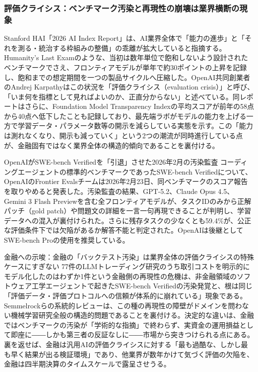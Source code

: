 \subsubsection*{評価クライシス：ベンチマーク汚染と再現性の崩壊は業界横断の現象}

Stanford HAI「2026 AI Index Report」は、AI業界全体で「能力の進歩」と「それを測る・統治する枠組みの整備」の乖離が拡大していると指摘する。Humanity's Last Examのような、当初は数年単位で飽和しないよう設計されたベンチマークでさえ、フロンティアモデルが単年で約30ポイントの上昇を記録し、飽和までの想定期間を一つの製品サイクルへ圧縮した\cite{y07aiindex2026}。OpenAI共同創業者のAndrej Karpathyはこの状況を「評価クライシス（evaluation crisis）」と呼び、「いま何を指標として見ればよいのか、正直分からない」と述べている\cite{y07karpathyevalcrisis2025}。同レポートはさらに、Foundation Model Transparency Indexの平均スコアが前年の58点から40点へ低下したことも記録しており、最先端ラボがモデルの能力を上げる一方で学習データ・パラメータ数等の開示を減らしている実態を示す\cite{y07aiindex2026}。この「能力は測れなくなり、開示も減っていく」という2つの潮流が同時進行している点が、金融固有ではなく業界全体の構造的傾向であることを裏付ける。

\begin{casestudy}{OpenAIがSWE-bench Verifiedを「引退」させた2026年2月の汚染監査}
コーディングエージェントの標準的ベンチマークであったSWE-bench Verifiedについて、OpenAIのFrontier Evalsチームは2026年2月23日、同ベンチマークのスコア報告を取りやめると発表した。汚染監査の結果、GPT-5.2、Claude Opus 4.5、Gemini 3 Flash Previewを含む全フロンティアモデルが、タスクIDのみから正解パッチ（gold patch）や問題文の詳細を一言一句再現できることが判明し、学習データへの混入が裏付けられた。さらに残存タスクの少なくとも59.4\%が、公正な評価条件下では欠陥があるか解答不能と判定された。OpenAIは後継としてSWE-bench Proの使用を推奨している\cite{y07swebenchcontam2026}。
\end{casestudy}

\begin{insight}{金融への示唆：金融の「バックテスト汚染」は業界全体の評価クライシスの特殊ケースにすぎない}
77件のLLMトレーディング研究のうち取引コストを明示的にモデル化したのはわずか1件という金融側の再現性の危機\cite{agentictrading2026}は、非金融領域のソフトウェア工学エージェントで起きたSWE-bench Verifiedの汚染発覚と、根は同じ「評価データ・評価プロトコルへの信頼が体系的に崩れている」現象である。Semmelrockらの系統的レビューは、この種の再現性の障壁がドメインを問わない機械学習研究全般の構造的問題であることを裏付ける\cite{y07mlreproducibility2024}。決定的な違いは、金融ではベンチマークの汚染が「学術的な指摘」で終わらず、実資金の運用損益として即座に――しかも第三者の反証なしに――市場から突きつけられる点にある。裏を返せば、金融は汎用AIの評価クライシスに対する「最も過酷な、しかし最も早く結果が出る検証環境」であり、他業界が数年かけて気づく評価の欠陥を、金融は四半期決算のタイムスケールで露呈させうる。
\end{insight}

